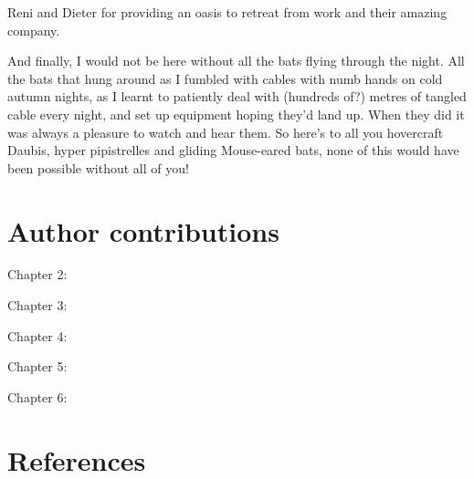 \documentclass[
]{book}
\begin{document}
Reni and Dieter for providing an oasis to retreat from work and their amazing company.

And finally, I would not be here without all the bats flying through the night. All the bats that hung around as I fumbled with cables with numb hands on cold autumn nights, as I learnt to patiently deal with (hundreds of?) metres of tangled cable every night, and set up equipment hoping they'd land up. When they did it was always a pleasure to watch and hear them. So here's to all you hovercraft Daubis, hyper pipistrelles and gliding Mouse-eared bats, none of this would have been possible without all of you!

\hypertarget{author-contributions}{%
\chapter{Author contributions}\label{author-contributions}}

Chapter 2:

Chapter 3:

Chapter 4:

Chapter 5:

Chapter 6:

\hypertarget{references}{%
\chapter{References}\label{references}}

  
\end{document}
